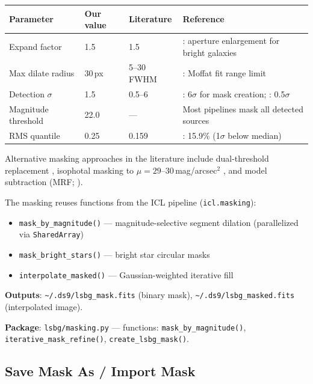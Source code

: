 \documentclass[11pt,fleqn]{book}
\begin{document}
\begin{center}
\begin{tabular}{L{3.5cm} L{2cm} L{2cm} L{5cm}}
\toprule
\textbf{Parameter} & \textbf{Our value} & \textbf{Literature} & \textbf{Reference} \\
\midrule
Expand factor          & 1.5  & 1.5            & \textcite{prole2018}: aperture enlargement for bright galaxies \\
Max dilate radius      & 30\,px & 5--30\,FWHM  & \textcite{zaritsky2019}: Moffat fit range limit \\
Detection $\sigma$     & 1.5  & 0.5--6         & \textcite{prole2018}: 6$\sigma$ for mask creation; \textcite{infante-sainz2020}: 0.5$\sigma$ \\
Magnitude threshold    & 22.0 & ---            & Most pipelines mask all detected sources \\
RMS quantile           & 0.25 & 0.159          & \textcite{prole2018}: 15.9\% (1$\sigma$ below median) \\
\bottomrule
\end{tabular}
\end{center}

\noindent Alternative masking approaches in the literature include dual-threshold replacement \parencite{greco2018,carlsten2020}, isophotal masking to $\mu = 29\text{--}30$\,mag/arcsec$^2$ \parencite{prole2018,infante-sainz2020}, and model subtraction (MRF; \textcite{vandokkum2020}).

The masking reuses functions from the ICL pipeline (\texttt{icl.masking}):
\begin{itemize}[leftmargin=2em]
  \item \texttt{mask\_by\_magnitude()} --- magnitude-selective segment dilation (parallelized via \texttt{SharedArray})
  \item \texttt{mask\_bright\_stars()} --- bright star circular masks
  \item \texttt{interpolate\_masked()} --- Gaussian-weighted iterative fill
\end{itemize}

\textbf{Outputs}: \texttt{\textasciitilde/.ds9/lsbg\_mask.fits} (binary mask), \texttt{\textasciitilde/.ds9/lsbg\_masked.fits} (interpolated image).

\textbf{Package}: \texttt{lsbg/masking.py} --- functions: \texttt{mask\_by\_magnitude()}, \texttt{iterative\_mask\_refine()}, \texttt{create\_lsbg\_mask()}.

\subsection{Save Mask As / Import Mask}
\label{sec:lsbg-mask-io}
\end{document}
